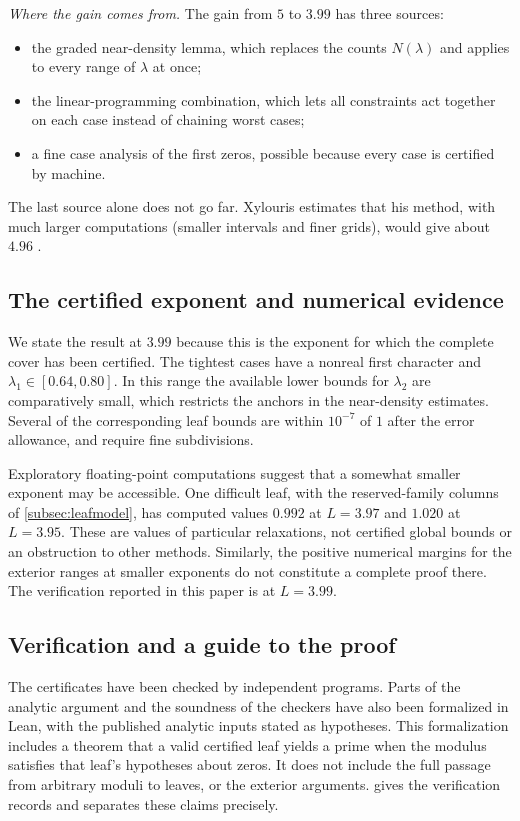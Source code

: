 \documentclass[11pt]{amsart}
\numberwithin{equation}{section}
\theoremstyle{plain}
\theoremstyle{definition}
\theoremstyle{remark}
\newcommand{\1}{\mathbf{1}}
\begin{document}
\emph{Where the gain comes from.} The gain from $5$ to $3.99$ has three sources:
\begin{itemize}
  \item the graded near-density lemma, which replaces the counts $N(\lambda)$ and applies to every
    range of $\lambda$ at once;
  \item the linear-programming combination, which lets all constraints act together on each
    case instead of chaining worst cases;
  \item a fine case analysis of the first zeros, possible because every case is certified by
    machine.
\end{itemize}
The last source alone does not go far. Xylouris estimates that his method, with much larger
computations (smaller intervals and finer grids), would give about $4.96$ \cite[p.~82]{Xylouris2018linnik}.

\subsection{The certified exponent and numerical evidence}\label{subsec:why}
We state the result at $3.99$ because this is the exponent for which the complete cover
has been certified. The tightest cases have a nonreal first character and
$\lambda_1\in[0.64,0.80]$. In this range the available lower bounds for $\lambda_2$ are
comparatively small, which restricts the anchors in the near-density estimates.
Several of the corresponding leaf bounds are within $10^{-7}$ of $1$ after the error
allowance, and require fine subdivisions.

Exploratory floating-point computations suggest that a somewhat smaller exponent may
be accessible. One difficult leaf, with the reserved-family columns of
\cref{subsec:leafmodel}, has computed values $0.992$ at $L=3.97$ and $1.020$ at $L=3.95$.
These are values of particular relaxations, not certified global bounds or an obstruction
to other methods. Similarly, the positive numerical margins for the exterior ranges at
smaller exponents do not constitute a complete proof there. The verification reported in
this paper is at $L=3.99$.

\subsection{Verification and a guide to the proof}\label{subsec:checked}
The certificates have been checked by independent programs. Parts of the analytic
argument and the soundness of the checkers have also been formalized in Lean, with the
published analytic inputs stated as hypotheses. This formalization includes a theorem
that a valid certified leaf yields a prime when the modulus satisfies that leaf's
hypotheses about zeros. It does not include the full passage from arbitrary moduli to
leaves, or the exterior arguments.  gives the verification records
and separates these claims precisely.
\end{document}
